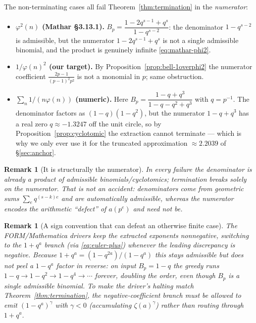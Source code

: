 \documentclass[11pt]{article}
\newtheorem{remark}[theorem]{Remark}
\begin{document}
The non-terminating cases all fail Theorem~\ref{thm:termination} in the
\emph{numerator}:
\begin{itemize}
\item \textbf{$\varphi^2(n)$ (Mathar \S3.13.1).}
$B_p=\dfrac{1-2q^{s-1}+q^{s}}{1-q^{s-2}}$: the denominator $1-q^{s-2}$ is admissible,
but the numerator $1-2q^{s-1}+q^{s}$ is not a single admissible binomial, and the
product is genuinely infinite \eqref{eq:mathar-phi2}.
\item \textbf{$1/\varphi(n)^2$ (our target).} By
Proposition~\ref{prop:bell-1overphi2} the numerator coefficient
$\frac{2p-1}{(p-1)^2p^2}$ is not a monomial in $p$; same obstruction.
\item \textbf{$\sum_n 1/(n\varphi(n))$ (numeric).} Here
$B_p=\dfrac{1-q+q^3}{1-q-q^2+q^3}$ with $q=p^{-1}$. The denominator factors as
$(1-q)(1-q^2)$, but the numerator $1-q+q^3$ has a real zero $q\approx-1.3247$ off
the unit circle, so by Proposition~\ref{prop:cyclotomic} the extraction cannot
terminate --- which is why we only ever use it for the truncated approximation
$\approx 2.2039$ of \S\ref{sec:anchor}.
\end{itemize}

\begin{remark}[It is structurally the numerator]
In every failure the denominator is already a product of admissible
binomials/cyclotomics; termination breaks solely on the numerator. That is not an
accident: denominators come from geometric sums $\sum_e q^{(s-k)e}$ and are
automatically admissible, whereas the numerator encodes the arithmetic ``defect'' of
$a(p^e)$ and need not be.
\end{remark}

\begin{remark}[A sign convention that can defeat an otherwise finite case]
The FORM/Mathematica drivers keep the extracted exponents nonnegative, switching to
the $1+q^{a}$ branch (via \eqref{eq:euler-plus}) whenever the leading discrepancy is
negative. Because $1+q^{a}=(1-q^{2a})/(1-q^{a})$ this stays admissible but does not
peel a $1-q^{a}$ factor in reverse: on input $B_p=1-q$ the greedy runs
$1-q\to1-q^2\to1-q^4\to\cdots$ forever, doubling the order, even though $B_p$ is a
single admissible binomial. To make the driver's halting match
Theorem~\ref{thm:termination}, the negative-coefficient branch must be allowed to
emit $(1-q^{a})^{\gamma}$ with $\gamma<0$ (accumulating $\zeta(a)^{\gamma}$) rather
than routing through $1+q^{a}$.
\end{remark}
\end{document}
